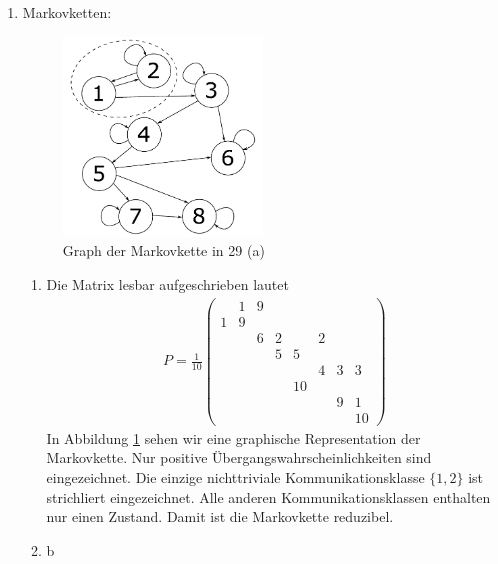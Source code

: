 \documentclass[a4paper,11pt,notitlepage,fullpage]{article}
\begin{document}
\begin{enumerate}
\newpage
\item Markovketten:
\begin{figure}[h!]
\centering
\includegraphics[width=0.5\textwidth]{gfx/29_a.pdf}
\caption{\label{fig:graph} Graph der Markovkette in 29 (a)}
\end{figure}

\begin{enumerate}
\item Die Matrix lesbar aufgeschrieben lautet
\begin{align*}
P = \frac{1}{10}\begin{pmatrix}
&1&9&&&&&\\
1&9&&&&&&\\
&&6&2&&2&&\\
&&&5&5&&&\\
&&&&&4&3&3\\
&&&&10&&&\\
&&&&&&9&1\\
&&&&&&&10
\end{pmatrix}
\end{align*}
In Abbildung \ref{fig:graph} sehen wir eine graphische Representation der Markovkette. Nur positive Übergangswahrscheinlichkeiten sind eingezeichnet. Die einzige nichttriviale Kommunikationsklasse $\{1, 2\}$ ist strichliert eingezeichnet. Alle anderen Kommunikationsklassen enthalten nur einen Zustand. Damit ist die Markovkette reduzibel.
\item b
\begin{align*}
\end{align*}
\end{enumerate}

\end{enumerate}
\end{document}
